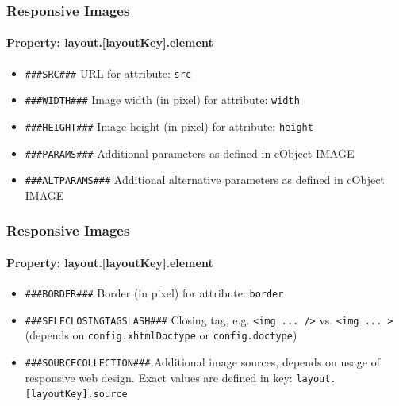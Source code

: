 
\begin{frame}[fragile]
	\frametitle{Responsive Images}
	\framesubtitle{Property: layout.[layoutKey].element}

	\begin{itemize}
		\item \lstinline!###SRC###!\newline
			URL for attribute: \texttt{src}

		\item \lstinline!###WIDTH###!\newline
			Image width (in pixel) for attribute: \texttt{width}

		\item \lstinline!###HEIGHT###!\newline
			Image height (in pixel) for attribute: \texttt{height}

		\item \lstinline!###PARAMS###!\newline
			Additional parameters as defined in cObject IMAGE

		\item \lstinline!###ALTPARAMS###!\newline
			Additional alternative parameters as defined in cObject IMAGE
	\end{itemize}

\end{frame}


\begin{frame}[fragile]
	\frametitle{Responsive Images}
	\framesubtitle{Property: layout.[layoutKey].element}

	\begin{itemize}
		\item \lstinline!###BORDER###!\newline
			Border (in pixel) for attribute: \texttt{border}

		\item \lstinline!###SELFCLOSINGTAGSLASH###!\newline
			Closing tag, e.g. \texttt{<img ... />} vs. \texttt{<img ... >}\newline
			(depends on \texttt{config.xhtmlDoctype} or \texttt{config.doctype})

		\item \lstinline!###SOURCECOLLECTION###!\newline
			Additional image sources, depends on usage of responsive web design.
			Exact values are defined in key: \texttt{layout.[layoutKey].source}
	\end{itemize}

\end{frame}

